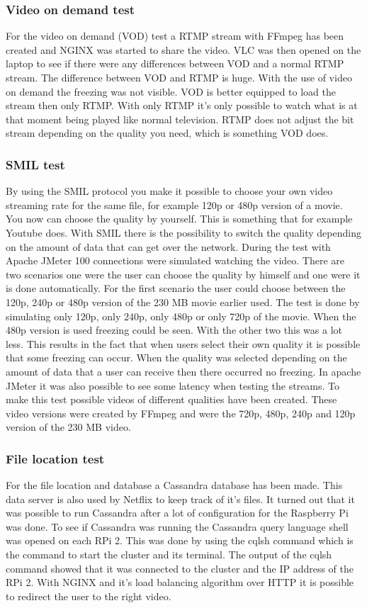\documentclass{sig-alternate-br}
\begin{document}
\subsubsection{Video on demand test}
For the video on demand (VOD) test a RTMP stream with FFmpeg has been created and NGINX was started to share the video. VLC was then opened on the laptop to see if there were any differences between VOD and a normal RTMP stream. The difference between VOD and RTMP is huge. With the use of video on demand the freezing was not visible. VOD is better equipped to load the stream then only RTMP. With only RTMP it's only possible to watch what is at that moment being played like normal television. RTMP does not adjust the bit stream depending on the quality you need, which is something VOD does.

\subsubsection{SMIL test}
By using the SMIL protocol you make it possible to choose your own video streaming rate for the same file, for example 120p or 480p version of a movie. You now can choose the quality by yourself. This is something that for example Youtube does. With SMIL there is the possibility to switch the quality depending on the amount of data that can get over the network. During the test with Apache JMeter 100 connections were simulated watching the video. There are two scenarios one were the user can choose the quality by himself and one were it is done automatically. For the first scenario the user could choose between the 120p, 240p or 480p version of the 230 MB movie earlier used. The test is done by simulating only 120p, only 240p, only 480p or only 720p of the movie. When the 480p version is used freezing could be seen. With the other two this was a lot less. This results in the fact that when users select their own quality it is possible that some freezing can occur. When the quality was selected depending on the amount of data that a user can receive then there occurred no freezing. In apache JMeter it was also possible to see some latency when testing the streams. To make this test possible videos of different qualities have been created. These video versions were created by FFmpeg and were the 720p, 480p, 240p and 120p version of the 230 MB video. 

\subsubsection{File location test}
For the file location and database a Cassandra database has been made. This data server is also used by Netflix to keep track of it's files. It turned out that it was possible to run Cassandra after a lot of configuration for the Raspberry Pi was done. To see if Cassandra was running the Cassandra query language shell was  opened on each RPi 2. This was done by using the cqlsh command which is the command to start the cluster and its terminal. The output of the cqlsh command showed that it was connected to the cluster and the IP address of the RPi 2. \newline
With NGINX and it's load balancing algorithm over HTTP it is possible to redirect the user to the right video. 
\end{document}
